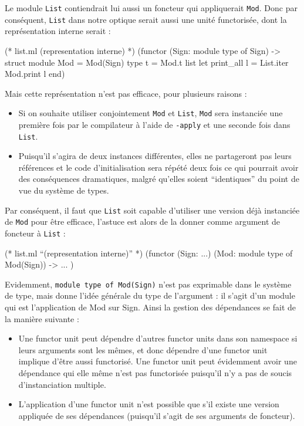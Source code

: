 \documentclass[11pt,a4paper]{report}
\begin{document}
Le module \texttt{List} contiendrait lui aussi un foncteur qui appliquerait
\texttt{Mod}. Donc par conséquent, \texttt{List} dans notre optique serait aussi
une unité functorisée, dont la représentation interne serait :
\begin{OCaml}
(* list.ml (representation interne) *)
(functor (Sign: module type of Sign) ->
  struct
    module Mod = Mod(Sign)
    type t = Mod.t list
    let print_all l = List.iter Mod.print l
  end)
\end{OCaml}
Mais cette représentation n'est pas efficace, pour plusieurs raisons :
\begin{itemize}
\item Si on souhaite utiliser conjointement \texttt{Mod} et \texttt{List},
  \texttt{Mod} sera instanciée une première fois par le compilateur à l'aide de
  \texttt{-apply} et une seconde fois dans \texttt{List}.
\item Puisqu'il s'agira de deux instances différentes, elles ne partageront pas
  leurs références et le code d'initialisation sera répété deux fois ce qui
  pourrait avoir des conséquences dramatiques, malgré qu'elles soient
  ``identiques'' du point de vue du système de types.
\end{itemize}
Par conséquent, il faut que \texttt{List} soit capable d'utiliser une version
déjà instanciée de \texttt{Mod} pour être efficace, l'astuce est alors de la donner
comme argument de foncteur à \texttt{List} :
\begin{OCaml}
(* list.ml ``(representation interne)'' *)
(functor (Sign: ...) (Mod: module type of Mod(Sign)) ->
   ...
)
\end{OCaml}
Evidemment, \lstinline{module type of Mod(Sign)} n'est pas exprimable dans le
système de type, mais donne l'idée générale du type de l'argument : il s'agit
d'un module qui est l'application de Mod sur Sign. Ainsi la gestion des
dépendances se fait de la manière suivante :
\begin{itemize}
\item Une functor unit peut dépendre d'autres functor units dans son namespace
  si leurs arguments sont les mêmes, et donc dépendre d'une functor unit
  implique d'être aussi functorisé. Une functor unit peut évidemment avoir une
  dépendance qui elle même n'est pas functorisée puisqu'il n'y a pas de soucis
  d'instanciation multiple.
\item L'application d'une functor unit n'est possible que s'il existe une
  version appliquée de ses dépendances (puisqu'il s'agit de ses arguments
  de foncteur).
\end{itemize}
\end{document}
